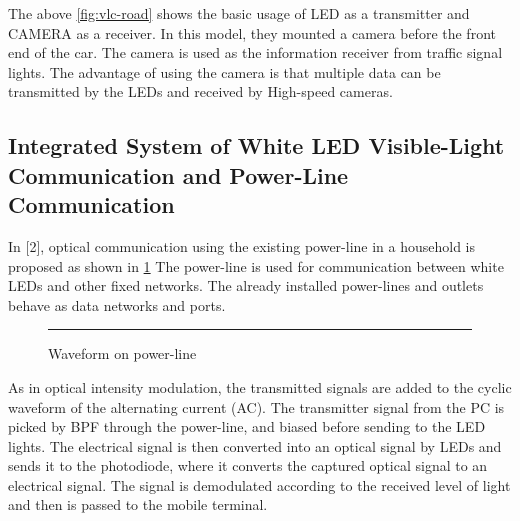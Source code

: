 The above \ref{fig:vlc-road} shows the basic usage of LED as a transmitter and CAMERA as a
receiver. In this model, they mounted a camera before the front end of the car. The
camera is used as the information receiver from traffic signal lights. The advantage of
using the camera is that multiple data can be transmitted by the LEDs and received by
High-speed cameras. 


\subsection{Integrated System of White LED Visible-Light Communication and Power-Line Communication}

In [2], optical communication using the existing power-line in a household is proposed as
shown in \ref{fig:vlc-powerline}
The power-line is used for communication between white LEDs and other fixed
networks. The already installed power-lines and outlets behave as data networks and
ports.

\begin{figure}[htbp]
  \centering
    \rule{35em}{0.5pt}
  \caption[Waveform on power-line]{Waveform on power-line}
  \label{fig:vlc-powerline}
\end{figure}

As in optical intensity modulation, the transmitted signals are added to the cyclic
waveform of the alternating current (AC). The transmitter signal from the PC is picked
by BPF through the power-line, and biased before sending to the LED lights. The
electrical signal is then converted into an optical signal by LEDs and sends it to the
photodiode, where it converts the captured optical signal to an electrical signal. The
signal is demodulated according to the received level of light and then is passed to the
mobile terminal.

